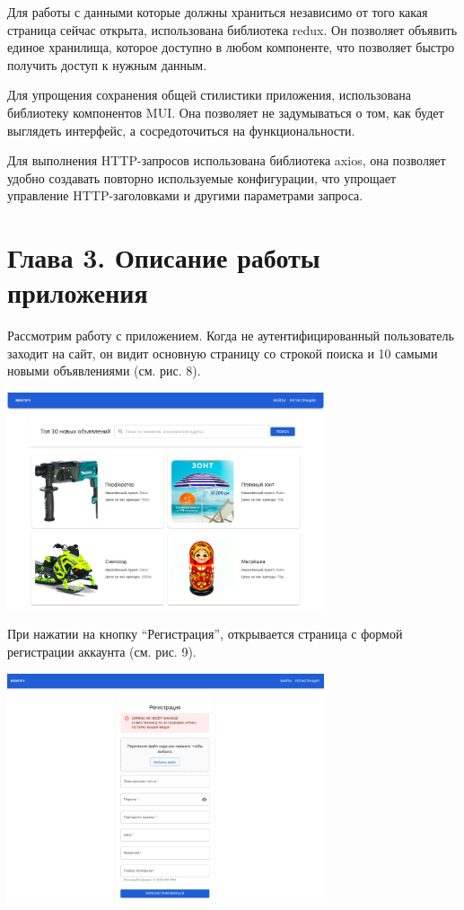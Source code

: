 \documentclass[14pt]{extarticle}
\begin{document}
\bigskip

Для работы с данными которые должны храниться независимо от того какая страница сейчас открыта,
использована библиотека redux. Он позволяет объявить единое хранилища,
которое доступно в любом компоненте, что позволяет быстро получить доступ к нужным данным.

\bigskip

Для упрощения сохранения общей стилистики приложения, использована библиотеку компонентов
MUI. Она позволяет не задумываться о том, как будет выглядеть интерфейс, а сосредоточиться
на функциональности.

\bigskip

Для выполнения HTTP-запросов использована библиотека axios,
она позволяет удобно создавать повторно используемые конфигурации,
что упрощает управление HTTP-заголовками и другими параметрами запроса.

\newpage

\section{Глава 3. Описание работы приложения}

Рассмотрим работу с приложением. Когда не аутентифицированный пользователь заходит
на сайт, он видит основную страницу со строкой поиска
и 10 самыми новыми объявлениями (см. рис. 8).

\begin{center}
    \includegraphics[width=0.7\textwidth]{homePage.png}
\end{center}

При нажатии на кнопку ``Регистрация'', открывается страница с формой регистрации
аккаунта (см. рис. 9).

\begin{center}
    \includegraphics[width=0.7\textwidth]{register.png}
\end{center}
\end{document}
